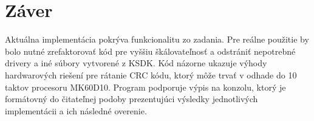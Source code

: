 \documentclass[../projekt.tex]{subfiles}
\begin{document}
\chapter{Záver}
Aktuálna implementácia pokrýva funkcionalitu zo zadania. Pre reálne použitie by bolo nutné zrefaktorovať kód pre vyššiu škálovateľnosť a odstrániť nepotrebné drivery a iné súbory vytvorené z KSDK.
Kód názorne ukazuje výhody hardwarových riešení pre rátanie CRC kódu, ktorý môže trvať v odhade do 10 taktov procesoru MK60D10. Program podporuje výpis na konzolu, ktorý je formátovný do čitateľnej podoby prezentujúci výsledky jednotlivých implementácii a ich následné overenie.
\end{document}

